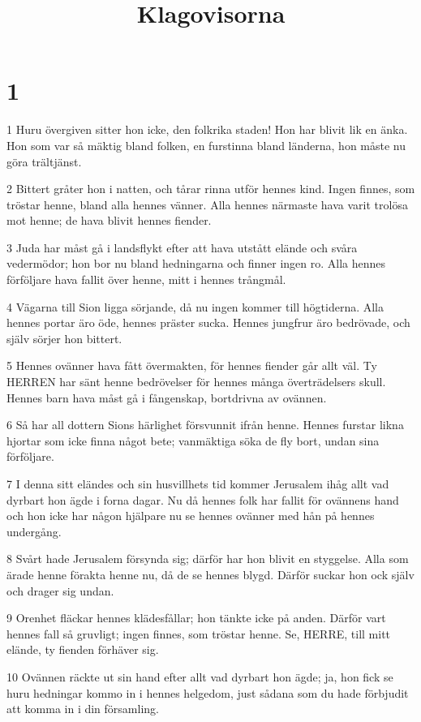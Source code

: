 

\title{Klagovisorna}


\chapter{1}

\par 1 Huru övergiven sitter hon icke, den folkrika staden! Hon har blivit lik en änka. Hon som var så mäktig bland folken, en furstinna bland länderna, hon måste nu göra trältjänst.
\par 2 Bittert gråter hon i natten, och tårar rinna utför hennes kind. Ingen finnes, som tröstar henne, bland alla hennes vänner. Alla hennes närmaste hava varit trolösa mot henne; de hava blivit hennes fiender.
\par 3 Juda har måst gå i landsflykt efter att hava utstått elände och svåra vedermödor; hon bor nu bland hedningarna och finner ingen ro. Alla hennes förföljare hava fallit över henne, mitt i hennes trångmål.
\par 4 Vägarna till Sion ligga sörjande, då nu ingen kommer till högtiderna. Alla hennes portar äro öde, hennes präster sucka. Hennes jungfrur äro bedrövade, och själv sörjer hon bittert.
\par 5 Hennes ovänner hava fått övermakten, för hennes fiender går allt väl. Ty HERREN har sänt henne bedrövelser för hennes många överträdelsers skull. Hennes barn hava måst gå i fångenskap, bortdrivna av ovännen.
\par 6 Så har all dottern Sions härlighet försvunnit ifrån henne. Hennes furstar likna hjortar som icke finna något bete; vanmäktiga söka de fly bort, undan sina förföljare.
\par 7 I denna sitt eländes och sin husvillhets tid kommer Jerusalem ihåg allt vad dyrbart hon ägde i forna dagar. Nu då hennes folk har fallit för ovännens hand och hon icke har någon hjälpare nu se hennes ovänner med hån på hennes undergång.
\par 8 Svårt hade Jerusalem försynda sig; därför har hon blivit en styggelse. Alla som ärade henne förakta henne nu, då de se hennes blygd. Därför suckar hon ock själv och drager sig undan.
\par 9 Orenhet fläckar hennes klädesfållar; hon tänkte icke på anden. Därför vart hennes fall så gruvligt; ingen finnes, som tröstar henne. Se, HERRE, till mitt elände, ty fienden förhäver sig.
\par 10 Ovännen räckte ut sin hand efter allt vad dyrbart hon ägde; ja, hon fick se huru hedningar kommo in i hennes helgedom, just sådana som du hade förbjudit att komma in i din församling.
